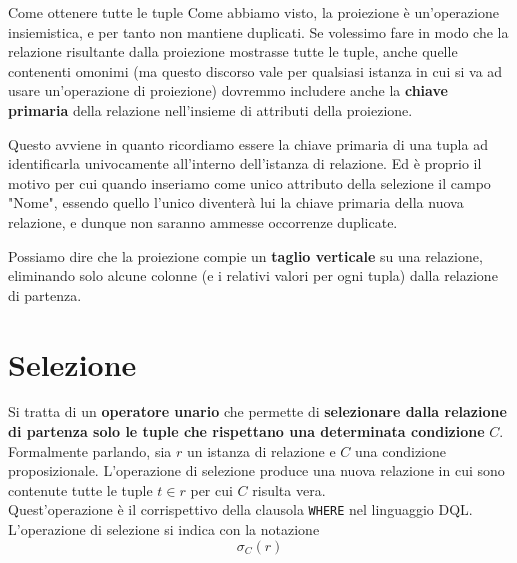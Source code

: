 \documentclass[12pt]{report}
\begin{document}
	\begin{osservazione}{Come ottenere tutte le tuple}{}
		Come abbiamo visto, la proiezione è un'operazione insiemistica, e per tanto non mantiene duplicati. Se volessimo fare in modo che la relazione risultante dalla proiezione mostrasse tutte le tuple, anche quelle contenenti omonimi (ma questo discorso vale per qualsiasi istanza in cui si va ad usare un'operazione di proiezione) dovremmo includere anche la \textbf{chiave primaria} della relazione nell'insieme di attributi della proiezione.
		\smallbreak
		
		Questo avviene in quanto ricordiamo essere la chiave primaria di una tupla ad identificarla univocamente all'interno dell'istanza di relazione. Ed è proprio il motivo per cui quando inseriamo come unico attributo della selezione il campo "Nome", essendo quello l'unico diventerà lui la chiave primaria della nuova relazione, e dunque non saranno ammesse occorrenze duplicate.
	\end{osservazione}
	
	Possiamo dire che la proiezione compie un \textbf{taglio verticale} su una relazione, eliminando solo alcune colonne (e i relativi valori per ogni tupla) dalla relazione di partenza.
	
	\section{Selezione}
	Si tratta di un \textbf{operatore unario} che permette di \textbf{selezionare dalla relazione di partenza solo le tuple che rispettano una determinata condizione} $C$.\\
	Formalmente parlando, sia $r$ un istanza di relazione e $C$ una condizione proposizionale. L'operazione di selezione produce una nuova relazione in cui sono contenute tutte le tuple $t \in r$ per cui $C$ risulta vera.\\
	Quest'operazione è il corrispettivo della clausola \texttt{WHERE} nel linguaggio DQL.
	L'operazione di selezione si indica con la notazione
	\[
		\sigma_C(r)
	\]
	
\end{document}
